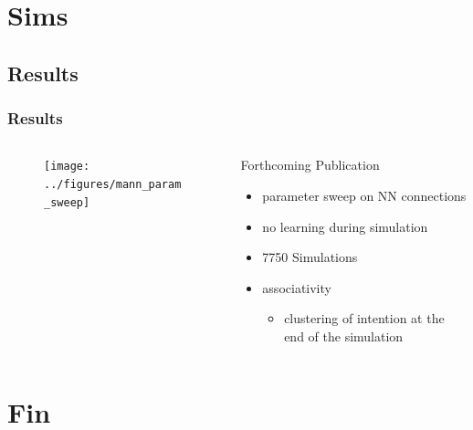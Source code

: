 \documentclass[compress]{beamer}
\begin{document}
\section{Sims}

\subsection{Results}

    \begin{frame}[Blank]\frametitle{Results}
        \begin{columns}
            \begin{column}{0.5\linewidth}
                \vspace{-7mm}
                        \begin{figure}
                            \centering
                            \texttt{[image: ../figures/mann\_param\_sweep]}
                            \caption{}
                            \label{fig:mannparamsweep}
                        \end{figure}
            \end{column}
            \begin{column}{0.5\linewidth}
                Forthcoming Publication
                
                \begin{itemize}
                    \item parameter sweep on NN connections
                    \item no learning during simulation
                    \item 7750 Simulations
                    \item associativity
                    \begin{itemize}
                        \item  clustering of intention at the end of the simulation
                    \end{itemize}
                \end{itemize}
            \end{column}
        \end{columns}

    \end{frame}

\section{Fin}
\end{document}
